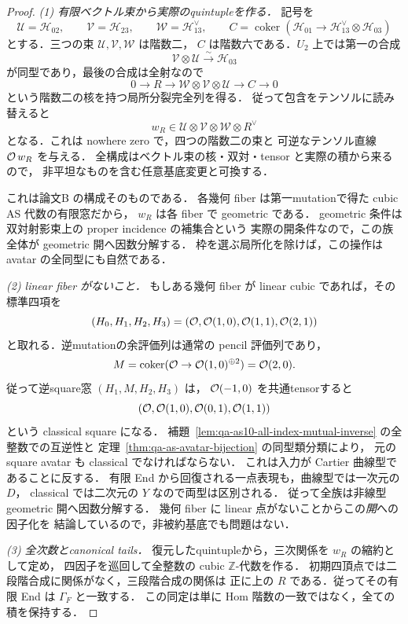 \begin{proof}
\emph{(1) 有限ベクトル束から実際のquintupleを作る．}
記号を
\[
 \mathcal U=\mathcal H_{02},\qquad
 \mathcal V=\mathcal H_{23},\qquad
 \mathcal W=\mathcal H_{13}^{\vee},\qquad
 C=\operatorname{coker}
   (\mathcal H_{01}\to\mathcal H_{13}^{\vee}\otimes\mathcal H_{03})
\]
とする．三つの束 $\mathcal U,\mathcal V,\mathcal W$ は階数二，
$C$ は階数六である．$U_2$ 上では第一の合成
\[
 \mathcal V\otimes\mathcal U\xrightarrow{\sim}\mathcal H_{03}
\]
が同型であり，最後の合成は全射なので
\[
 0\to R\longrightarrow
 \mathcal W\otimes\mathcal V\otimes\mathcal U
 \longrightarrow C\to0
\]
という階数二の核を持つ局所分裂完全列を得る．
従って包含をテンソルに読み替えると
\[
 w_R\in
 \mathcal U\otimes\mathcal V\otimes\mathcal W\otimes R^\vee
\]
となる．これは nowhere zero で，四つの階数二の束と
可逆なテンソル直線 $\mathcal O\,w_R$ を与える．
全構成はベクトル束の核・双対・tensor と実際の積から来るので，
非平坦なものを含む任意基底変更と可換する．

これは論文B \cite[\texttt{prop:cubic-foundation-open}]{QuadricModuli2026} の構成そのものである．
各幾何 fiber は第一mutationで得た cubic AS 代数の有限窓だから，
$w_R$ は各 fiber で geometric である．
geometric 条件は双対射影束上の proper incidence の補集合という
実際の開条件なので，この族全体が geometric 開へ因数分解する．
枠を選ぶ局所化を除けば，この操作は avatar の全同型にも自然である．

\emph{(2) linear fiber がないこと．}
もしある幾何 fiber が linear cubic であれば，その標準四項を
\[
 (H_0,H_1,H_2,H_3)
 =(\mathcal O,\mathcal O(1,0),\mathcal O(1,1),\mathcal O(2,1))
\]
と取れる．逆mutationの余評価列は通常の pencil 評価列であり，
\[
 M=\operatorname{coker}(\mathcal O\to\mathcal O(1,0)^{\oplus2})
   =\mathcal O(2,0).
\]
従って逆square窓 $(H_1,M,H_2,H_3)$ は，
$\mathcal O(-1,0)$ を共通tensorすると
\[
 (\mathcal O,\mathcal O(1,0),\mathcal O(0,1),\mathcal O(1,1))
\]
という classical square になる．
補題~\ref{lem:qa-as10-all-index-mutual-inverse} の全整数での互逆性と
定理~\ref{thm:qa-as-avatar-bijection} の同型類分類により，
元の square avatar も classical でなければならない．
これは入力が Cartier 曲線型であることに反する．
有限 End から回復される一点表現も，曲線型では一次元の $D$，
classical では二次元の $Y$ なので両型は区別される．
従って全族は非線型 geometric 開へ因数分解する．
幾何 fiber に linear 点がないことからこの\emph{開}への因子化を
結論しているので，非被約基底でも問題はない．

\emph{(3) 全次数とcanonical tails．}
復元したquintupleから，三次関係を $w_R$ の縮約として定め，
四因子を巡回して全整数の cubic $\mathbb Z$-代数を作る．
初期四頂点では二段階合成に関係がなく，三段階合成の関係は
正に上の $R$ である．従ってその有限 End は $\Gamma_F$ と一致する．
この同定は単に Hom 階数の一致ではなく，全ての積を保持する．


\end{proof}
